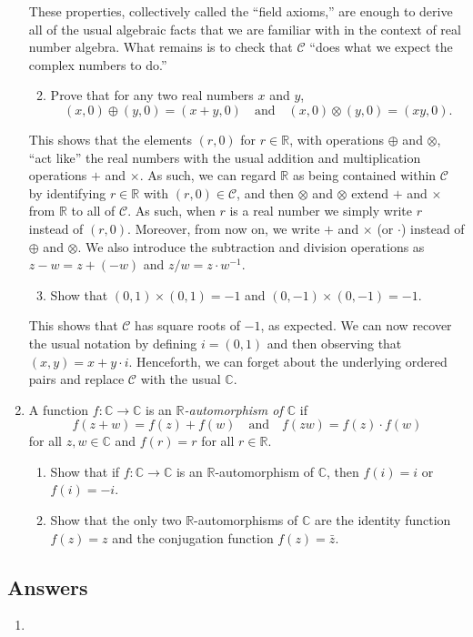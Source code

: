 \begin{enumerate}
These properties, collectively called the ``field axioms,'' are enough to derive all of the usual algebraic facts that we are familiar with in the context of real number algebra. What remains is to check that $\mathcal{C}$ ``does what we expect the complex numbers to do.''
\begin{enumerate}\setcounter{enumii}{1}
\item Prove that for any two real numbers $x$ and $y$,
\begin{equation*}
(x,0)\oplus (y,0) = (x + y,0)\quad\text{and}\quad (x,0)\otimes (y,0) = (xy,0).
\end{equation*}
\end{enumerate}
This shows that the elements $(r,0)$ for $r\in\mathbb{R}$, with operations $\oplus$ and $\otimes$, ``act like'' the real numbers with the usual addition and multiplication operations $+$ and $\times$. As such, we can regard $\mathbb{R}$ as being contained within $\mathcal{C}$ by identifying $r\in\mathbb{R}$ with $(r,0)\in\mathcal{C}$, and then $\otimes$ and $\otimes$ extend $+$ and $\times$ from $\mathbb{R}$ to all of $\mathcal{C}$. As such, when $r$ is a real number we simply write $r$ instead of $(r,0)$. Moreover, from now on, we write $+$ and $\times$ (or $\cdot$) instead of $\oplus$ and $\otimes$. We also introduce the subtraction and division operations as $z - w = z + (-w)$ and $z/w = z\cdot w^{-1}$.
\begin{enumerate}\setcounter{enumii}{2}
\item Show that $(0,1)\times (0,1) = -1$ and $(0,-1)\times (0,-1) = -1$.
\end{enumerate}
This shows that $\mathcal{C}$ has square roots of $-1$, as expected. We can now recover the usual notation by defining $i = (0,1)$ and then observing that $(x,y) = x + y\cdot i$. Henceforth, we can forget about the underlying ordered pairs and replace $\mathcal{C}$ with the usual $\mathbb{C}$.
\item A function $f:\mathbb{C}\to\mathbb{C}$ is an \emph{$\mathbb{R}$-automorphism of $\mathbb{C}$} if
\begin{equation*}
f(z + w) = f(z) + f(w)\quad\text{and}\quad f(zw) = f(z)\cdot f(w)
\end{equation*}
for all $z,w\in\mathbb{C}$ and $f(r) = r$ for all $r\in\mathbb{R}$.
\begin{enumerate}
\item Show that if $f:\mathbb{C}\to\mathbb{C}$ is an $\mathbb{R}$-automorphism of $\mathbb{C}$, then $f(i) = i$ or $f(i) = -i$.
\item Show that the only two $\mathbb{R}$-automorphisms of $\mathbb{C}$ are the identity function $f(z) = z$ and the conjugation function $f(z) = \bar{z}$.
\end{enumerate}
\end{enumerate}


\newpage
\subsection{Answers}

\begin{enumerate}
\item 
\end{enumerate}